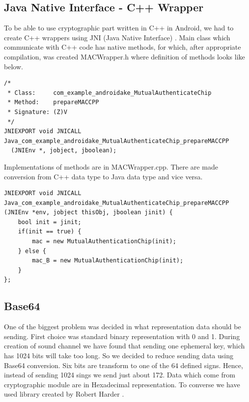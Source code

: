 \documentclass[11pt,titlepage]{article}
\theoremstyle{plain}
\begin{document}
\subsection{Java Native Interface - C++ Wrapper}

To be able to use cryptographic part written in C++ in Android, we had to create C++ wrappers using JNI (Java Native Interface) \cite{JNI}. Main class which communicate with C++ code has native methods, for which, after appropriate compilation, was created MACWrapper.h where definition of methods looks like below.

\begin{lstlisting}
/*
 * Class:     com_example_androidake_MutualAuthenticateChip
 * Method:    prepareMACCPP
 * Signature: (Z)V
 */
JNIEXPORT void JNICALL Java_com_example_androidake_MutualAuthenticateChip_prepareMACCPP
  (JNIEnv *, jobject, jboolean);
\end{lstlisting}

Implementations of methods are in MACWrapper.cpp. There are made conversion from C++ data type to Java data type and vice versa.

\begin{lstlisting}
JNIEXPORT void JNICALL Java_com_example_androidake_MutualAuthenticateChip_prepareMACCPP
(JNIEnv *env, jobject thisObj, jboolean jinit) {
	bool init = jinit;
	if(init == true) {
		mac = new MutualAuthenticationChip(init);
	} else {
		mac_B = new MutualAuthenticationChip(init);
	}
};
\end{lstlisting}

\subsection{Base64}

One of the biggest problem was decided in what representation data should be sending. First choice was standard binary representation with 0 and 1. During creation of sound channel we have found that sending one ephemeral key, which has 1024 bits will take too long. So we decided to reduce sending data using Base64 conversion. Six bits are transform to one of the 64 defined signs. Hence, instead of sending 1024 sings we send just about 172. Data which come from cryptographic module are in Hexadecimal representation. To converse we have used library created by Robert Harder \cite{base_64}. 
\end{document}
